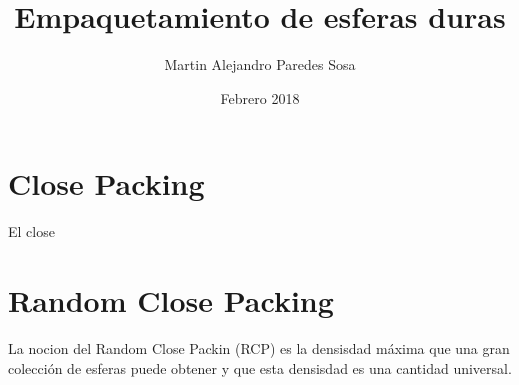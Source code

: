 \documentclass[12pt, journal, a4paper, onecolumn]{IEEEtran}
\author{Martin Alejandro Paredes Sosa}
\title{Empaquetamiento de esferas duras}
\date{Febrero 2018}
\begin{document}
\maketitle

\section*{Close Packing}
El close 

\section*{Random Close Packing}
La nocion del Random Close Packin (RCP) es la densisdad máxima que una gran colección de esferas puede obtener y que esta densisdad es una cantidad universal.

\nocite{*}


\end{document}
